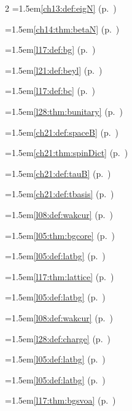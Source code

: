 \begin{multicols}{2}
\hangindent=1.5em\quad \ref{ch13:def:eigN} (p.~\pageref{ch13:def:eigN})\par
\hangindent=1.5em\quad \ref{ch14:thm:betaN} (p.~\pageref{ch14:thm:betaN})\par
\hangindent=1.5em\quad \ref{l17:def:bg} (p.~\pageref{l17:def:bg})\par
\hangindent=1.5em\quad \ref{l21:def:beyl} (p.~\pageref{l21:def:beyl})\par
\hangindent=1.5em\quad \ref{l17:def:bc} (p.~\pageref{l17:def:bc})\par
\hangindent=1.5em\quad \ref{l28:thm:bunitary} (p.~\pageref{l28:thm:bunitary})\par
\hangindent=1.5em\quad \ref{ch21:def:spaceB} (p.~\pageref{ch21:def:spaceB})\par
\hangindent=1.5em\quad \ref{ch21:thm:spinDict} (p.~\pageref{ch21:thm:spinDict})\par
\hangindent=1.5em\quad \ref{ch21:def:tauB} (p.~\pageref{ch21:def:tauB})\par
\hangindent=1.5em\quad \ref{ch21:def:tbasis} (p.~\pageref{ch21:def:tbasis})\par
\hangindent=1.5em\quad \ref{l08:def:wakcur} (p.~\pageref{l08:def:wakcur})\par
\hangindent=1.5em\quad \ref{l05:thm:bgcore} (p.~\pageref{l05:thm:bgcore})\par
\hangindent=1.5em\quad \ref{l05:def:latbg} (p.~\pageref{l05:def:latbg})\par
\hangindent=1.5em\quad \ref{l17:thm:lattice} (p.~\pageref{l17:thm:lattice})\par
\hangindent=1.5em\quad \ref{l05:def:latbg} (p.~\pageref{l05:def:latbg})\par
\hangindent=1.5em\quad \ref{l08:def:wakcur} (p.~\pageref{l08:def:wakcur})\par
\hangindent=1.5em\quad \ref{l28:def:charge} (p.~\pageref{l28:def:charge})\par
\hangindent=1.5em\quad \ref{l05:def:latbg} (p.~\pageref{l05:def:latbg})\par
\hangindent=1.5em\quad \ref{l05:def:latbg} (p.~\pageref{l05:def:latbg})\par
\hangindent=1.5em\quad \ref{l17:thm:bgsvoa} (p.~\pageref{l17:thm:bgsvoa})\par

\end{multicols}
